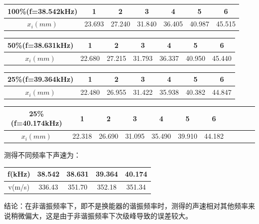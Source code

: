 \documentclass[a4paper, 10pt]{article}
\begin{document}
\begin{center}
    \begin{tabular}{|c|c|c|c|c|c|c|}
        \hline
        100\%(f=38.542kHz)&1&2&3&4&5&6\\
        \hline
        $x_i(mm)$&23.693&27.240&31.840&36.405&40.987&45.515\\
        \hline
        
        
        
    \end{tabular}
    \end{center}
    \begin{center}
        \begin{tabular}{|c|c|c|c|c|c|c|}
            \hline
            50\%(f=38.631kHz)&1&2&3&4&5&6\\
            \hline
            $x_i(mm)$&22.680&27.215&31.793&36.337&40.950&45.440\\
            \hline
            
            
            
        \end{tabular}
        \end{center}
        \begin{center}
            \begin{tabular}{|c|c|c|c|c|c|c|}
                \hline
                25\%(f=39.364kHz)&1&2&3&4&5&6\\
                \hline
                $x_i(mm)$&22.480&26.955&31.422&35.938&40.382&44.847\\
                \hline
                
                
            \end{tabular}
            \end{center}
            \begin{center}
                \begin{tabular}{|c|c|c|c|c|c|c|c|c|c|c|}
                    \hline
                    25\%(f=40.174kHz)&1&2&3&4&5&6\\
                    \hline
                    $x_i(mm)$&22.318&26.690&31.095&35.490&39.910&44.182\\
                    \hline
                    
                \end{tabular}
                \end{center}
    测得不同频率下声速为：
    \begin{center}
        \begin{tabular}{|c|c|c|c|c|}
            \hline
            f(kHz)&38.542&38.631&39.364&40.174\\
            \hline
             v(m/s)&336.43&351.70&352.18&351.34\\
            \hline
            
        \end{tabular}
        \end{center}
结论：在非谐振频率下，即不是换能器的谐振频率时，测得的声速相对其他频率来说稍微偏大，这是由于非谐振频率下次级峰导致的误差较大。
\end{document}
